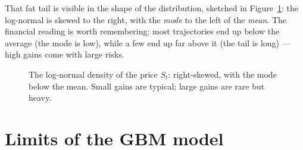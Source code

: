 That fat tail is visible in the shape of the distribution, sketched in Figure~\ref{fig:lognormal}: the log-normal is skewed to the right, with the \emph{mode} to the left of the \emph{mean}.
The financial reading is worth remembering: most trajectories end up below the average (the mode is low), while a few end up far above it (the tail is long) --- high gains come with large risks.

\begin{figure}[h!]
\centering
{}
\caption{The log-normal density of the price $S_t$: right-skewed, with the mode below the mean. Small gains are typical; large gains are rare but heavy.}
\label{fig:lognormal}
\end{figure}


\section{Limits of the GBM model}\label{sec:gbm-limits}

